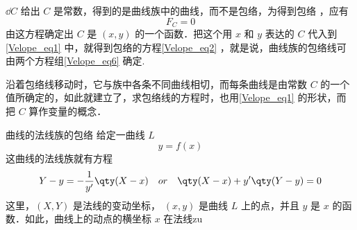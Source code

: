 $\dd C$ 给出 $C$ 是常数，得到的是曲线族中的曲线，而不是包络，为得到包络
，应有
\begin{equation}
F_C=0
\end{equation}
由这方程确定出 $C$ 是 $(x,y)$ 的一个函数．把这个用 $x$ 和 $y$ 表达的 $C$ 代入到\autoref{Velope_eq1} 中，就得到包络的方程\autoref{Velope_eq2} ，就是说，曲线族的包络线可由两个方程组\autoref{Velope_eq6} 确定.

沿着包络线移动时，它与族中各条不同曲线相切，而每条曲线是由常数 $C$ 的一个值所确定的，如此就建立了，求包络线的方程时，也用\autoref{Velope_eq1} 的形状，而把 $C$ 算作变量的概念．
\begin{example}{曲线的法线族的包络}
给定一曲线 $L$
\begin{equation}
y=f(x)
\end{equation}
这曲线的法线族就有方程
\begin{equation}
Y-y=-\frac{1}{y'}\qty(X-x)\quad or\quad\qty(X-x)+y'\qty(Y-y)=0
\end{equation}
这里，$(X,Y)$ 是法线的变动坐标， $(x,y)$ 是曲线 $L$ 上的点，并且 $y$ 是 $x$ 的函数．如此，曲线上的动点的横坐标 $x$ 在法线zu
\end{example}